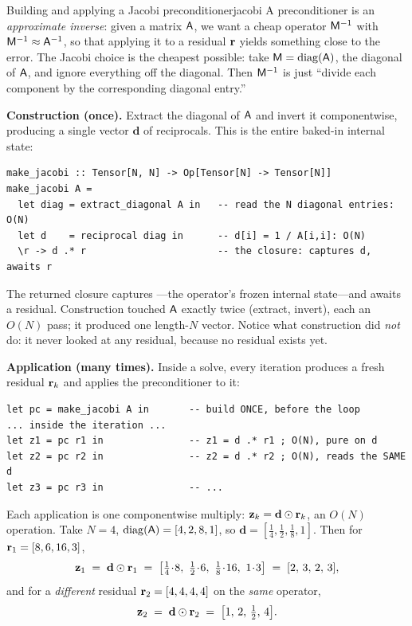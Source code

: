\begin{workedexample}{Building and applying a Jacobi preconditioner}{jacobi}
A preconditioner is an \emph{approximate inverse}: given a matrix $\mathsf{A}$, we want
a cheap operator $\mathsf{M}^{-1}$ with $\mathsf{M}^{-1}\approx \mathsf{A}^{-1}$, so that
applying it to a residual $\mathbf{r}$ yields something close to the error. The Jacobi
choice is the cheapest possible: take $\mathsf{M}=\operatorname{diag}(\mathsf{A})$, the
diagonal of $\mathsf{A}$, and ignore everything off the diagonal. Then $\mathsf{M}^{-1}$ is
just ``divide each component by the corresponding diagonal entry.''

\textbf{Construction (once).} Extract the diagonal of $\mathsf{A}$ and invert it
componentwise, producing a single vector $\mathbf{d}$ of reciprocals. This is the entire
baked-in internal state:
\begin{lstlisting}[style=l4style]
make_jacobi :: Tensor[N, N] -> Op[Tensor[N] -> Tensor[N]]
make_jacobi A =
  let diag = extract_diagonal A in   -- read the N diagonal entries: O(N)
  let d    = reciprocal diag in      -- d[i] = 1 / A[i,i]: O(N)
  \r -> d .* r                       -- the closure: captures d, awaits r
\end{lstlisting}
The returned closure captures ---the operator's frozen internal state---and
awaits a residual. Construction touched $\mathsf{A}$ exactly twice (extract, invert),
each an $O(N)$ pass; it produced one length-$N$ vector. Notice what construction did
\emph{not} do: it never looked at any residual, because no residual exists yet.

\textbf{Application (many times).} Inside a solve, every iteration produces a fresh
residual $\mathbf{r}_k$ and applies the preconditioner to it:
\begin{lstlisting}[style=l4style]
let pc = make_jacobi A in       -- build ONCE, before the loop
... inside the iteration ...
let z1 = pc r1 in               -- z1 = d .* r1 ; O(N), pure on d
let z2 = pc r2 in               -- z2 = d .* r2 ; O(N), reads the SAME d
let z3 = pc r3 in               -- ...
\end{lstlisting}
Each application is one componentwise multiply: $\mathbf{z}_k = \mathbf{d} \odot \mathbf{r}_k$, an $O(N)$
operation. Take $N=4$, $\operatorname{diag}(\mathsf{A})=[4,2,8,1]$, so $\mathbf{d} =
[\tfrac14,\tfrac12,\tfrac18,1]$. Then for $\mathbf{r}_1=[8,6,16,3]$,
\[
  \vz_1 \;=\; \mathbf{d} \odot \vr_1 \;=\; \bigl[\tfrac14\!\cdot\!8,\ \tfrac12\!\cdot\!6,\
  \tfrac18\!\cdot\!16,\ 1\!\cdot\!3\bigr] \;=\; [2,\,3,\,2,\,3],
\]
and for a \emph{different} residual $\mathbf{r}_2=[4,4,4,4]$ on the \emph{same} operator,
\[
  \mathbf{z}_2 \;=\; \mathbf{d} \odot \mathbf{r}_2 \;=\; \bigl[1,\,2,\,\tfrac12,\,4\bigr].
\]


\end{workedexample}
